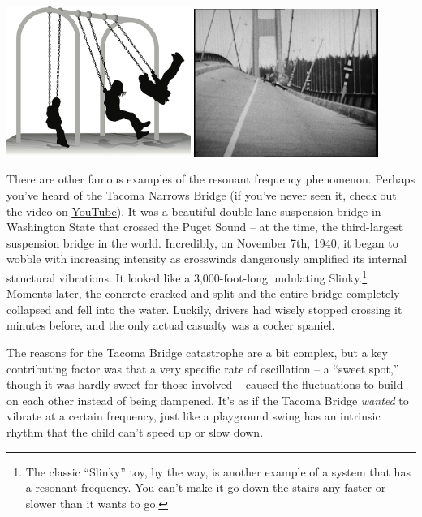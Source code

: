\begin{center}
\label{tacoma}
\includegraphics[width=0.45\textwidth]{swing.png}
\quad
\includegraphics[width=0.45\textwidth]{tacoma.jpg}
\end{center}


There are other famous examples of the resonant frequency phenomenon. Perhaps
you've heard of the Tacoma Narrows Bridge (if you've never seen it, check out
the video on
\href{https://www.youtube.com/watch?v=j-zczJXSxnw}{\underline{YouTube}}). It
was a beautiful double-lane suspension bridge in Washington State that crossed
the Puget Sound -- at the time, the third-largest suspension bridge in the
world. Incredibly, on November 7th, 1940, it began to wobble with increasing
intensity as crosswinds dangerously amplified its internal structural
vibrations. It looked like a 3,000-foot-long undulating Slinky.\footnote{The
classic ``Slinky'' toy, by the way, is another example of a system that has a
resonant frequency. You can't make it go down the stairs any faster or slower
than it wants to go.} Moments later, the concrete cracked and split and the
entire bridge completely collapsed and fell into the water. Luckily, drivers
had wisely stopped crossing it minutes before, and the only actual casualty was
a cocker spaniel.

The reasons for the Tacoma Bridge catastrophe are a bit complex, but a key
contributing factor was that a very specific rate of oscillation -- a ``sweet
spot,'' though it was hardly sweet for those involved -- caused the
fluctuations to build on each other instead of being dampened. It's as if the
Tacoma Bridge \textit{wanted} to vibrate at a certain frequency, just like a
playground swing has an intrinsic rhythm that the child can't speed up or slow
down.


